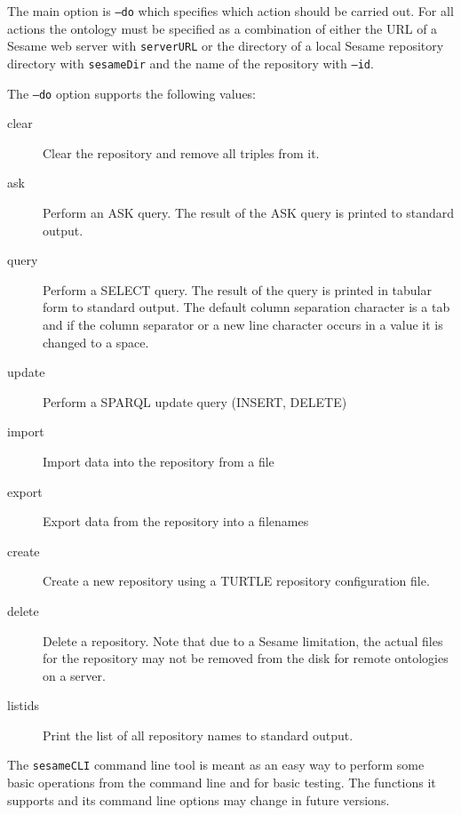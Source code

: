 {The main option is \texttt{--do} which specifies which action should be carried
out. For all actions the ontology must be specified as a combination of 
either the URL of a Sesame web server with \texttt{serverURL} or the 
directory of a local Sesame repository directory with \texttt{sesameDir} and the name 
of the repository with \texttt{--id}.

The \texttt{--do} option supports the following values:
\begin{description}
 \item [clear] Clear the repository and remove all triples from it.
 \item [ask] Perform an ASK query. The result of the ASK query is printed to standard output.
 \item [query] Perform a SELECT query. The result of the query is printed in tabular form to
   standard output. The default column separation character is a tab and  
   if the column separator or a new line character occurs in a value it is changed to 
   a space.
 \item [update] Perform a SPARQL update query (INSERT, DELETE)
 \item [import] Import data into the repository from a file
 \item [export] Export data from the repository into a filenames
 \item [create] Create a new repository using a TURTLE repository configuration file.
 \item [delete] Delete a repository. Note that due to a Sesame limitation, the actual
   files for the repository may not be removed from the disk for remote ontologies
   on a server.
 \item [listids] Print the list of all repository names to standard output.
\end{description}


The \texttt{sesameCLI} command line tool is meant as an easy way to perform
some basic operations from the command line and for basic testing. The functions
it supports and its command line options may change in future versions.

}
